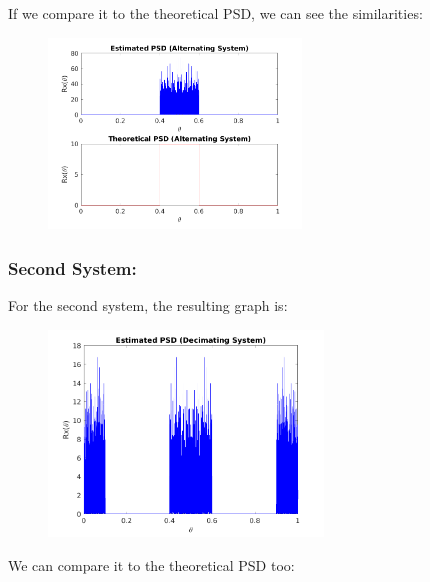 \documentclass[a4paper,11pt]{article}
\begin{document}
If we compare it to the theoretical PSD, we can see the similarities:

\begin{figure}[!hp]
    \begin{center}
      \includegraphics[width=0.6\textwidth]{images/study4/comp_psd_a.png}
    \end{center}
\end{figure}

\newpage

\subsubsection{Second System:}

For the second system, the resulting graph is:

\begin{figure}[!hp]
    \begin{center}
      \includegraphics[width=0.65\textwidth]{images/study4/R_es_d.png}
    \end{center}
\end{figure}

We can compare it to the theoretical PSD too:
\end{document}
